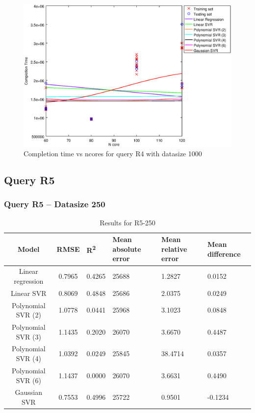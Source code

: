 \documentclass[a4paper,11pt]{article}
\begin{document}
\begin {figure}[hbtp]
\centering
\includegraphics[width=\textwidth]{output/R4_1000_LINEAR_NCORE/plot_R4_1000.eps}
\caption{Completion time vs ncores for query R4 with datasize 1000}
\label{fig:all_linear_R4_1000}
\end {figure}

\newpage
\subsection{Query R5}
\subsubsection{Query R5 -- Datasize 250}

\begin{table}[H]
	\centering
	\begin{adjustbox}{center}
		\begin{tabular}{c | c M{1.2cm} M{2.5cm} M{2.5cm} M{1.8cm}}
			Model & RMSE & R\textsuperscript{2} & Mean absolute error & Mean relative error & Mean difference \tabularnewline
			\hline
			Linear regression & 0.7965 & 0.4265 &  25688 & 1.2827 & 0.0152 \\
			Linear SVR & 0.8069 & 0.4848 &  25686 & 2.0375 & 0.0249 \\
			Polynomial SVR (2) & 1.0778 & 0.0441 &  25968 & 3.1023 & 0.0848 \\
			Polynomial SVR (3) & 1.1435 & 0.2020 &  26070 & 3.6670 & 0.4487 \\
			Polynomial SVR (4) & 1.0392 & 0.0249 &  25845 & 38.4714 & 0.0357 \\
			Polynomial SVR (6) & 1.1437 & 0.0000 &  26070 & 3.6631 & 0.4490 \\
			Gaussian SVR & 0.7553 & 0.4996 &  25722 & 0.9501 & -0.1234 \\
		\end{tabular}
	\end{adjustbox}
	\\
	\caption{Results for R5-250}
	\label{fig:all_linear_R5_250}
\end{table}
\end{document}
